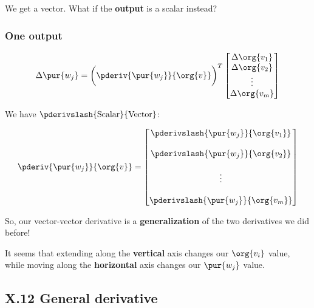             We get a vector. What if the \textbf{output} is a scalar instead?
        
        \subsubsection*{One output}
        
            \begin{equation}
                \Delta \pur{w_j}
                =
                \bigg(
                    \pderiv{ \pur{w_j} }{ \org{v} } 
                \bigg)^T
                \begin{bmatrix}
                    \Delta \org{v_1}\\ \Delta \org{v_2}\\ \vdots \\ \Delta \org{v_m}
                \end{bmatrix}
            \end{equation}
            
            We have $\pderivslash{ \text{Scalar} }{ \text{Vector} }$:
            
            \begin{equation}
                \pderiv{ \pur{w_j} }{ \org{v} } 
                =
                \begin{bmatrix}
                    \pderivslash{ \pur{w_j} }   { \org{v_1} }\\\\
                    \pderivslash{ \pur{w_j} }   { \org{v_2} }\\\\
                    \vdots \\\\
                    \pderivslash{ \pur{w_j} }   { \org{v_m} }
                \end{bmatrix}
            \end{equation}
            
            So, our vector-vector derivative is a \textbf{generalization} of the two derivatives we did before! 
            
            It seems that extending along the \textbf{vertical} axis changes our $\org{v_i}$ value, while moving along the \textbf{horizontal} axis changes our $\pur{w_j}$ value.
         
    \secdiv
    
    \subsection*{X.12 \quad General derivative}  
        
